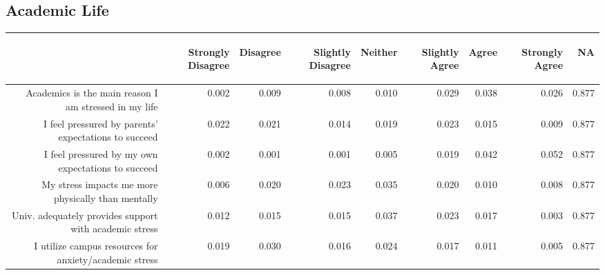 \documentclass{article}\usepackage[]{graphicx}\usepackage[]{color}
\begin{document}
\subsection{Academic Life}
\begin{table}[ht]
\centering
\begin{tabular}{rrrrrrrrr}
  \hline
 & \begin{sideways} Strongly Disagree \end{sideways} & \begin{sideways} Disagree \end{sideways} & \begin{sideways} Slightly Disagree \end{sideways} & \begin{sideways} Neither \end{sideways} & \begin{sideways} Slightly Agree \end{sideways} & \begin{sideways} Agree \end{sideways} & \begin{sideways} Strongly Agree \end{sideways} & \begin{sideways} NA \end{sideways} \\ 
  \hline
Academics is the main reason I am stressed in my life & 0.002 & 0.009 & 0.008 & 0.010 & 0.029 & 0.038 & 0.026 & 0.877 \\ 
  I feel pressured by parents' expectations to succeed & 0.022 & 0.021 & 0.014 & 0.019 & 0.023 & 0.015 & 0.009 & 0.877 \\ 
  I feel pressured by my own expectations to succeed & 0.002 & 0.001 & 0.001 & 0.005 & 0.019 & 0.042 & 0.052 & 0.877 \\ 
  My stress impacts me more physically than mentally & 0.006 & 0.020 & 0.023 & 0.035 & 0.020 & 0.010 & 0.008 & 0.877 \\ 
  Univ. adequately provides support with academic stress & 0.012 & 0.015 & 0.015 & 0.037 & 0.023 & 0.017 & 0.003 & 0.877 \\ 
  I utilize campus resources for anxiety/academic stress & 0.019 & 0.030 & 0.016 & 0.024 & 0.017 & 0.011 & 0.005 & 0.877 \\ 
   \hline
\end{tabular}
\end{table}
\end{document}
